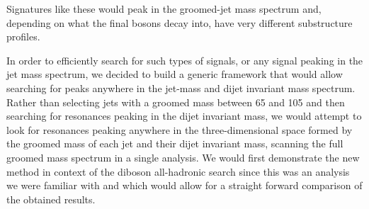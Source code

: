 Signatures like these would peak in the groomed-jet mass spectrum and, depending on what the final bosons decay into, have very different substructure profiles.\par
In order to efficiently search for such types of signals, or any signal peaking in the jet mass spectrum, we decided to build a generic framework that would allow searching for peaks anywhere in the jet-mass and dijet invariant mass spectrum.
Rather than selecting jets with a groomed mass between 65 and 105 \GeV and then searching for resonances peaking in the dijet invariant mass, we would attempt to look for resonances peaking anywhere in the three-dimensional space formed by the groomed mass of each jet and their dijet invariant mass, scanning the full groomed mass spectrum in a single analysis. We would first demonstrate the new method in context of the diboson all-hadronic search since this was an analysis we were familiar with and which would allow for a straight forward comparison of the obtained results.
